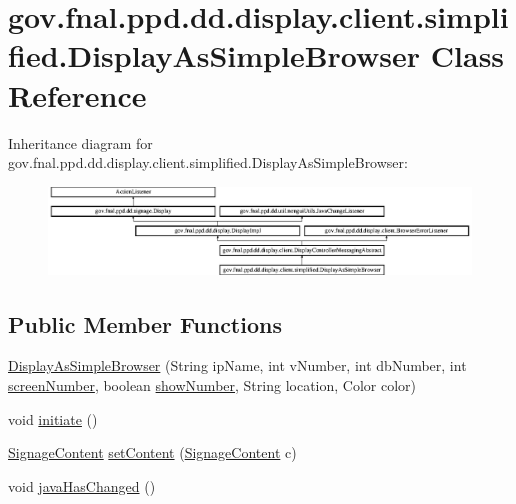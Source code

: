 \hypertarget{classgov_1_1fnal_1_1ppd_1_1dd_1_1display_1_1client_1_1simplified_1_1DisplayAsSimpleBrowser}{\section{gov.\-fnal.\-ppd.\-dd.\-display.\-client.\-simplified.\-Display\-As\-Simple\-Browser Class Reference}
\label{classgov_1_1fnal_1_1ppd_1_1dd_1_1display_1_1client_1_1simplified_1_1DisplayAsSimpleBrowser}
}
Inheritance diagram for gov.\-fnal.\-ppd.\-dd.\-display.\-client.\-simplified.\-Display\-As\-Simple\-Browser\-:\begin{figure}[H]
\begin{center}
\leavevmode
\includegraphics[height=2.350965cm]{classgov_1_1fnal_1_1ppd_1_1dd_1_1display_1_1client_1_1simplified_1_1DisplayAsSimpleBrowser}
\end{center}
\end{figure}
\subsection*{Public Member Functions}
\begin{DoxyCompactItemize}
\item 
\hyperlink{classgov_1_1fnal_1_1ppd_1_1dd_1_1display_1_1client_1_1simplified_1_1DisplayAsSimpleBrowser_a5eebea04df2b0fa101ccbecea55c3ae9}{Display\-As\-Simple\-Browser} (String ip\-Name, int v\-Number, int db\-Number, int \hyperlink{classgov_1_1fnal_1_1ppd_1_1dd_1_1display_1_1DisplayImpl_ace620614bde13cee492129c27f38db4e}{screen\-Number}, boolean \hyperlink{classgov_1_1fnal_1_1ppd_1_1dd_1_1display_1_1client_1_1DisplayControllerMessagingAbstract_aca138d2835d0f3794bc86261ad550f18}{show\-Number}, String location, Color color)
\item 
void \hyperlink{classgov_1_1fnal_1_1ppd_1_1dd_1_1display_1_1client_1_1simplified_1_1DisplayAsSimpleBrowser_a9454e792d76150a173105c3d38d6608f}{initiate} ()
\item 
\hyperlink{interfacegov_1_1fnal_1_1ppd_1_1dd_1_1signage_1_1SignageContent}{Signage\-Content} \hyperlink{classgov_1_1fnal_1_1ppd_1_1dd_1_1display_1_1client_1_1simplified_1_1DisplayAsSimpleBrowser_a7b69290947e6bf32aeb5a78a63b5706f}{set\-Content} (\hyperlink{interfacegov_1_1fnal_1_1ppd_1_1dd_1_1signage_1_1SignageContent}{Signage\-Content} c)
\item 
void \hyperlink{classgov_1_1fnal_1_1ppd_1_1dd_1_1display_1_1client_1_1simplified_1_1DisplayAsSimpleBrowser_a6661ef807b923f39560f4887d82a7dfd}{java\-Has\-Changed} ()
\end{DoxyCompactItemize}

